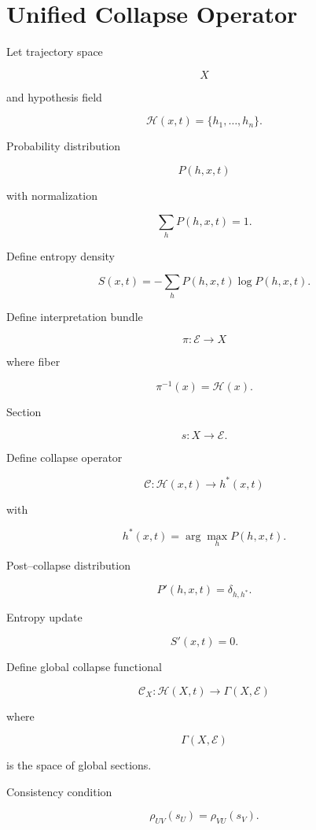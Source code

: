 \documentclass[11pt]{article}
\begin{document}

\section{Unified Collapse Operator}

Let trajectory space

\[
X
\]

and hypothesis field

\[
\mathcal{H}(x,t)
=
\{h_1,\dots,h_n\}.
\]

Probability distribution

\[
P(h,x,t)
\]

with normalization

\[
\sum_h P(h,x,t) = 1.
\]

Define entropy density

\[
S(x,t)
=
-
\sum_h
P(h,x,t)
\log P(h,x,t).
\]

Define interpretation bundle

\[
\pi :
\mathcal{E}
\rightarrow
X
\]

where fiber

\[
\pi^{-1}(x) =
\mathcal{H}(x).
\]

Section

\[
s :
X
\rightarrow
\mathcal{E}.
\]

Define collapse operator

\[
\mathcal{C} :
\mathcal{H}(x,t)
\rightarrow
h^*(x,t)
\]

with

\[
h^*(x,t)
=
\arg\max_h
P(h,x,t).
\]

Post–collapse distribution

\[
P'(h,x,t)
=
\delta_{h,h^*}.
\]

Entropy update

\[
S'(x,t) = 0.
\]

Define global collapse functional

\[
\mathcal{C}_X :
\mathcal{H}(X,t)
\rightarrow
\Gamma(X,\mathcal{E})
\]

where

\[
\Gamma(X,\mathcal{E})
\]

is the space of global sections.

Consistency condition

\[
\rho_{UV}(s_U)
=
\rho_{VU}(s_V).
\]
\end{document}
